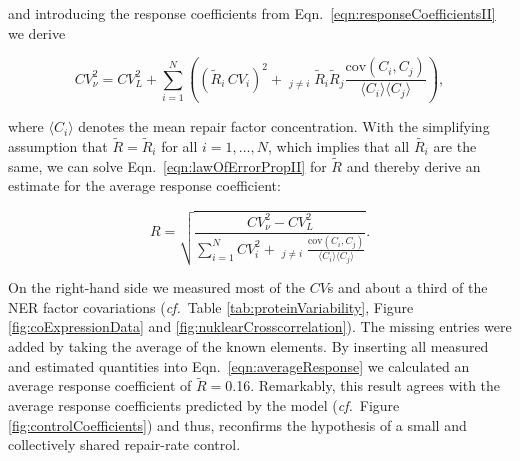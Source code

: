 and introducing the response coefficients from Eqn.\ \ref{eqn:responseCoefficientsII} we derive

\begin{equation}
	CV_{\nu}^2 = CV_{L}^2 + \sum_{i=1}^{N} \left((\tilde{R}_i\,CV_i)^2 + \mathop{\sum_{j = 1}^{N}}_{j\neq i} \tilde{R}_i\tilde{R}_j \frac{\textrm{cov}(C_i,C_j)}{\langle C_i \rangle\langle C_j\rangle}\right),
	\label{eqn:lawOfErrorPropII}
\end{equation}

where $\langle C_i \rangle$ denotes the mean repair factor concentration. With the simplifying assumption that $\tilde{R} = \tilde{R}_i$ for all $i = 1,\ldots,N$, which implies that all $\tilde{R_i}$ are the same, we can solve Eqn.\ \ref{eqn:lawOfErrorPropII} for $\tilde{R}$ and thereby derive an estimate for the average response coefficient:

\begin{equation}
	R = \sqrt{	\frac{CV_{\nu}^2 - CV_L^2}{\sum_{i=1}^{N} CV_i^2 + \mathop{\sum_{j=1}^{N}}_{j \neq i} \frac{\textrm{cov}(C_i,C_j)}{\langle C_i \rangle\langle C_j\rangle}}}.
	\label{eqn:averageResponse}
\end{equation} 


On the right-hand side we measured most of the $CV$s and about a third of the NER factor covariations (\textit{cf.}\ Table \ref{tab:proteinVariability}, Figure \ref{fig:coExpressionData} and \ref{fig:nuklearCrosscorrelation}). The missing entries were added by taking the average of the known elements. By inserting all measured and estimated quantities into Eqn.\ \ref{eqn:averageResponse} we calculated an average response coefficient of $\tilde{R} =$0.16. Remarkably, this result agrees with the average response coefficients predicted by the model (\textit{cf.}\ Figure \ref{fig:controlCoefficients}) and thus, reconfirms the hypothesis of a small and collectively shared repair-rate control.     





